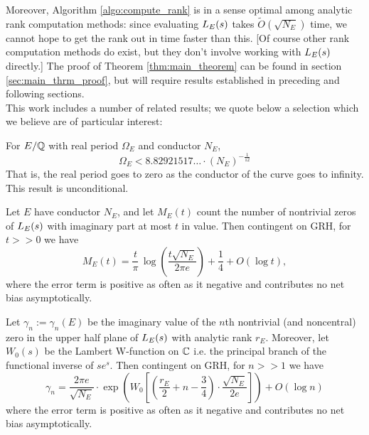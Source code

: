 Moreover, Algorithm \ref{algo:compute_rank} is in a sense optimal among analytic rank computation methods: since evaluating $L_E(s)$ takes $\tilde{O}(\sqrt{N_E})$ time, we cannot hope to get the rank out in time faster than this. [Of course other rank computation methods do exist, but they don't involve working with $L_E(s)$ directly.] The proof of Theorem \ref{thm:main_theorem} can be found in section \ref{sec:main_thrm_proof}, but will require results established in preceding and following sections. \\

This work includes a number of related results; we quote below a selection which we believe are of particular interest:

\begin{corollary}[\ref{cor:real_period_upper_bound}] 
For $E/\mathbb{Q}$ with real period $\Omega_E$ and conductor $N_E$,
\begin{equation}
\Omega_E < 8.82921517\ldots \cdot (N_E)^{-\frac{1}{12}}
\end{equation}
That is, the real period goes to zero as the conductor of the curve goes to infinity. This result is unconditional.
\end{corollary}

\begin{theorem}[\ref{thm:zero_density}]
Let $E$ have conductor $N_E$, and let $M_E(t)$ count the number of nontrivial zeros of $L_E(s)$ with imaginary part at most $t$ in value. Then contingent on GRH, for $t>>0$ we have
\begin{equation}\label{eqn:zero_density}
M_E(t) = \frac{t}{\pi} \, \log\left(\frac{t\sqrt{N_E}}{2\pi e}\right) + \frac{1}{4} + O(\log t),
\end{equation}
where the error term is positive as often as it negative and contributes no net bias asymptotically.
\end{theorem}

\begin{corollary}[\ref{cor:gamma_n_approx_value}]
Let $\gamma_n := \gamma_n(E)$ be the imaginary value of the $n$th nontrivial (and noncentral) zero in the upper half plane of $L_E(s)$ with analytic rank $r_E$.  Moreover, let $W_0 (s)$ be the Lambert W-function on $\mathbb{C}$ i.e. the principal branch of the functional inverse of $s e^s$. Then contingent on GRH, for $n >> 1$ we have
\begin{equation}
\gamma_n = \frac{2\pi e}{\sqrt{N_E}} \cdot \exp \left(W_0\left[\left(\frac{r_E}{2} +n - \frac{3}{4}\right)\cdot \frac{\sqrt{N_E}}{2 e}\right]\right) + O(\log n)
\end{equation}
where the error term is positive as often as it negative and contributes no net bias asymptotically.
\end{corollary}

